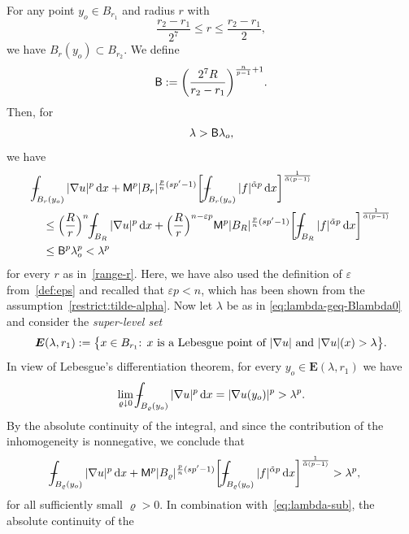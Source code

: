 \documentclass[10pt,letterpaper]{amsart}
\theoremstyle{definition}
\numberwithin{theorem}{section}
\numberwithin{equation}{section}
\newcommand{\1}{\ensuremath{\mathds{1}}}
\newcommand{\dx}{\mathrm{d}x}
\def\Xint#1{\mathchoice
    {\XXint\displaystyle\textstyle{#1}}%
    {\XXint\textstyle\scriptstyle{#1}}%
    {\XXint\scriptstyle\scriptscriptstyle{#1}}%
    {\XXint\scriptscriptstyle\scriptscriptstyle{#1}}%
    \!\int}
\def\XXint#1#2#3{\setbox0=\hbox{$#1{#2#3}{\int}$}
    \vcenter{\hbox{$#2#3$}}\kern-0.5\wd0}
\def\bint{\Xint-}
\renewcommand{\epsilon}{\varepsilon}
\renewcommand{\rho}{\varrho}
\renewcommand{\epsilon}{\varepsilon}
\renewcommand{\rho}{\varrho}
\numberwithin{equation}{section}
\begin{document}
For any point $y_o \in B_{r_1}$ and radius $r$ with
\begin{equation}\label{range-r}
    \frac{r_2-r_1}{2^7} \leq r \leq \frac{r_2-r_1}{2},
\end{equation}
we have $B_r(y_o)\subset B_{r_2}$.
We define 
\begin{equation}\label{def:B}
    {\sf B}:=
    \bigg(
    \frac{2^{7}R}{r_2-r_1}
    \bigg)^{\frac{n}{p-1}+1}.
\end{equation}
Then, for 
\begin{equation} \label{eq:lambda-geq-Blambda0}
    \lambda > {\sf B} \lambda_o,
\end{equation}
we have
\begin{align} \label{eq:lambda-sub}
    &\bint_{B_r(y_o)} |\nabla u|^p \,\dx + 
    {\sf M}^p|B_r|^{\frac{p}{n}(sp'- 1)} \bigg[\bint_{B_r(y_o)} |f|^{\tilde\alpha p} \,\dx \bigg]^{\frac{1}{\tilde\alpha(p-1)}} \nonumber\\
    &\quad\le 
    \Big(\frac{R}{r}\Big)^n\bint_{B_R} |\nabla u|^p \,\dx + 
    \Big(\frac{R}{r}\Big)^{{n-\epsilon p}} {\sf M}^p|B_R|^{\frac{p}{n}(sp'- 1)} \bigg[\bint_{B_R} |f|^{\tilde\alpha p} \,\dx \bigg]^{\frac{1}{\tilde\alpha(p-1)}} \nonumber\\
    &\quad \le 
    {\sf B}^p\lambda_o^p 
    < 
    \lambda^p
\end{align}
for every $r$ as in~\eqref{range-r}. 
Here, we have also used the definition of $\epsilon$ from~\eqref{def:eps} and recalled that 
$\varepsilon p < n$, which has been shown from the assumption~\eqref{restrict:tilde-alpha}.
Now let $\lambda$ be as in \eqref{eq:lambda-geq-Blambda0} and consider the {\it super-level set}
$$
    \boldsymbol E(\lambda,r_1) 
    := 
    \big\{\mbox{$x \in B_{r_1}$: $x$ is a Lebesgue point of $ |\nabla u|$ and $|\nabla u|(x) > \lambda$}\big\}.
$$
In view of Lebesgue's differentiation theorem, for every
\(y_o\in \boldsymbol E(\lambda,r_1)\) we have
\[
    \lim_{\rho\downarrow 0}
    \bint_{B_\rho(y_o)} |\nabla u|^p \,\dx
    =
    |\nabla u(y_o)|^p
    >
    \lambda^p .
\]
By the absolute continuity of the integral, and since the contribution of
the inhomogeneity is nonnegative, we conclude that
\begin{align*}
    \bint_{B_\rho(y_o)} |\nabla u|^p \,\dx
    &+
    {\sf M}^p
    |B_\rho|^{\frac{p}{n}(sp'- 1)}
    \bigg[
        \bint_{B_\rho(y_o)} |f|^{\tilde\alpha p} \,\dx
    \bigg]^{\frac{1}{\tilde\alpha(p-1)}}
    >
    \lambda^p ,
\end{align*}
for all sufficiently small \(\rho>0\).
In combination with~\eqref{eq:lambda-sub}, the absolute continuity of the
\end{document}

